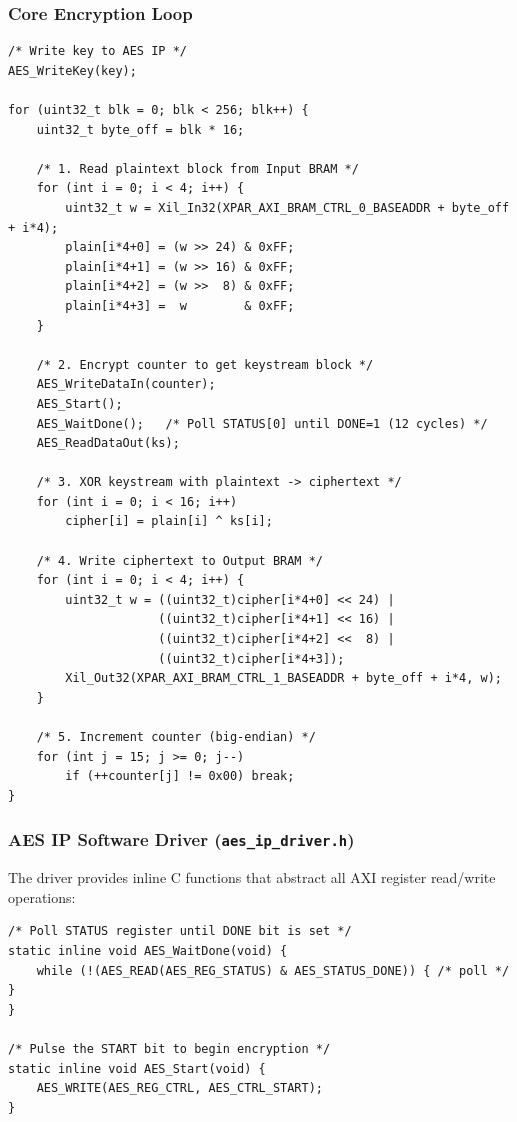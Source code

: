 \documentclass[12pt,a4paper]{article}
\begin{document}
\subsubsection{Core Encryption Loop}

\begin{lstlisting}[style=cstyle, caption={CTR Mode Encryption Loop (from main.c)}]
/* Write key to AES IP */
AES_WriteKey(key);

for (uint32_t blk = 0; blk < 256; blk++) {
    uint32_t byte_off = blk * 16;

    /* 1. Read plaintext block from Input BRAM */
    for (int i = 0; i < 4; i++) {
        uint32_t w = Xil_In32(XPAR_AXI_BRAM_CTRL_0_BASEADDR + byte_off + i*4);
        plain[i*4+0] = (w >> 24) & 0xFF;
        plain[i*4+1] = (w >> 16) & 0xFF;
        plain[i*4+2] = (w >>  8) & 0xFF;
        plain[i*4+3] =  w        & 0xFF;
    }

    /* 2. Encrypt counter to get keystream block */
    AES_WriteDataIn(counter);
    AES_Start();
    AES_WaitDone();   /* Poll STATUS[0] until DONE=1 (12 cycles) */
    AES_ReadDataOut(ks);

    /* 3. XOR keystream with plaintext -> ciphertext */
    for (int i = 0; i < 16; i++)
        cipher[i] = plain[i] ^ ks[i];

    /* 4. Write ciphertext to Output BRAM */
    for (int i = 0; i < 4; i++) {
        uint32_t w = ((uint32_t)cipher[i*4+0] << 24) |
                     ((uint32_t)cipher[i*4+1] << 16) |
                     ((uint32_t)cipher[i*4+2] <<  8) |
                     ((uint32_t)cipher[i*4+3]);
        Xil_Out32(XPAR_AXI_BRAM_CTRL_1_BASEADDR + byte_off + i*4, w);
    }

    /* 5. Increment counter (big-endian) */
    for (int j = 15; j >= 0; j--)
        if (++counter[j] != 0x00) break;
}
\end{lstlisting}

\subsubsection{AES IP Software Driver (\texttt{aes\_ip\_driver.h})}

The driver provides inline C functions that abstract all AXI register read/write operations:

\begin{lstlisting}[style=cstyle, caption={Key AES IP Driver Functions (aes\_ip\_driver.h)}]
/* Poll STATUS register until DONE bit is set */
static inline void AES_WaitDone(void) {
    while (!(AES_READ(AES_REG_STATUS) & AES_STATUS_DONE)) { /* poll */ }
}

/* Pulse the START bit to begin encryption */
static inline void AES_Start(void) {
    AES_WRITE(AES_REG_CTRL, AES_CTRL_START);
}
\end{lstlisting}
\end{document}
